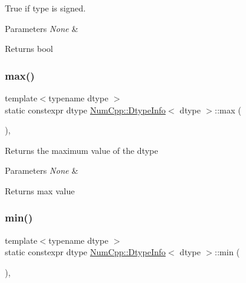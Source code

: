 True if type is signed.


\begin{DoxyParams}{Parameters}
{\em None} & \\
\hline
\end{DoxyParams}
\begin{DoxyReturn}{Returns}
bool 
\end{DoxyReturn}
\mbox{\label{class_num_cpp_1_1_dtype_info_ad24c59bdfce18ae8fb3aedef097231cf}} 
\subsubsection{\texorpdfstring{max()}{max()}}
{\footnotesize\ttfamily template$<$typename dtype $>$ \\
static constexpr dtype \mbox{\hyperlink{class_num_cpp_1_1_dtype_info}{Num\+Cpp\+::\+Dtype\+Info}}$<$ dtype $>$\+::max (\begin{DoxyParamCaption}{ }\end{DoxyParamCaption})\hspace{0.3cm}{\ttfamily [inline]}, {\ttfamily [static]}}

Returns the maximum value of the dtype


\begin{DoxyParams}{Parameters}
{\em None} & \\
\hline
\end{DoxyParams}
\begin{DoxyReturn}{Returns}
max value 
\end{DoxyReturn}
\mbox{\label{class_num_cpp_1_1_dtype_info_aef92445d06c7c31cd0b2622771457190}} 
\subsubsection{\texorpdfstring{min()}{min()}}
{\footnotesize\ttfamily template$<$typename dtype $>$ \\
static constexpr dtype \mbox{\hyperlink{class_num_cpp_1_1_dtype_info}{Num\+Cpp\+::\+Dtype\+Info}}$<$ dtype $>$\+::min (\begin{DoxyParamCaption}{ }\end{DoxyParamCaption})\hspace{0.3cm}{\ttfamily [inline]}, {\ttfamily [static]}}

